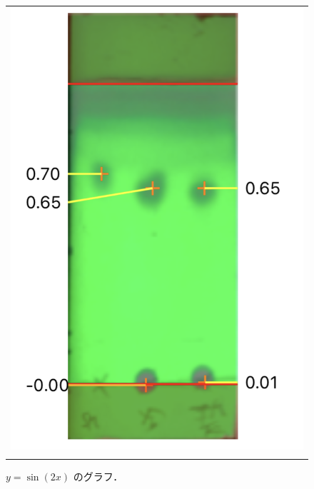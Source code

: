 \documentclass[a4paper,papersize,dvipdfmx]{jsarticle}
\begin{document}
\begin{figure}[htpb]
\begin{tabular}{c}
 
      \begin{minipage}{0.47\hsize}
        \centering
          \includegraphics[keepaspectratio, scale=0.60, angle=0]
                          {imgs6/tlc-u20.png}
                          \caption{$y=\sin(2x)$ のグラフ．}
                          \label{fig:sin_2x}
      \end{minipage} \\
 
 
      \begin{minipage}{0.06\hsize}
        \vspace{10mm}
      \end{minipage} \\
 

\end{tabular}
\end{figure}
\end{document}
